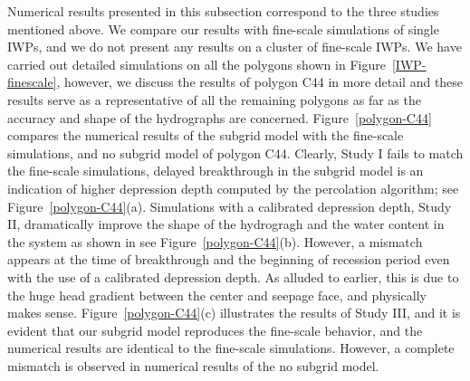 \documentclass[review,11pt]{elsarticle}
\begin{document}
Numerical results presented in this subsection correspond to the three studies mentioned above. We compare our results with fine-scale simulations of single IWPs, and we do not present any results on a cluster of fine-scale IWPs. We have carried out detailed simulations on all the polygons shown in Figure~\ref{IWP-finescale}, however, we discuss the results of polygon C44 in more detail and these results serve as a representative of all the remaining polygons as far as the accuracy and shape of the hydrographs are concerned. Figure~\ref{polygon-C44} compares the numerical results of the subgrid model with the fine-scale simulations, and no subgrid model of polygon C44. Clearly, Study I fails to match the fine-scale simulations, delayed breakthrough in the subgrid model is an indication of higher depression depth computed by the percolation algorithm; see Figure~\ref{polygon-C44}(a). Simulations with a calibrated depression depth, Study II, dramatically improve the shape of the hydrogragh and the water content in the system as shown in see Figure~\ref{polygon-C44}(b). However, a mismatch appears at the time of breakthrough and the beginning of recession period even with the use of a calibrated depression depth. As alluded to earlier, this is due to the huge head gradient between the center and seepage face, and physically makes sense. Figure~\ref{polygon-C44}(c) illustrates the results of Study III, and it is evident that our subgrid model reproduces the fine-scale behavior, and the numerical results are identical to the fine-scale simulations. However, a complete mismatch is observed in numerical results of the no subgrid model.
\end{document}
